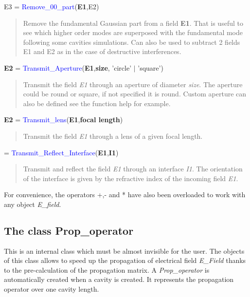 \noindent E3 = \textcolor{blue}{ Remove\_00\_part}(\textbf{E1},E2)
\vspace*{-0.2cm}
\begin{quote}
Remove the fundamental Gaussian part from a field \textbf{E1}. That is useful to see which higher order modes are superposed with the fundamental mode following some cavities simulations. Can also be used to subtract 2 fields E1 and E2 as in the case of destructive interferences.
\end{quote}


\noindent \textbf{E2} = \textcolor{blue}{Transmit\_Aperture}(\textbf{E1},\textbf{size}, 'circle' $\mid$ 'square')
\vspace*{-0.2cm}
\begin{quote}
Transmit the field \textsl{E1} through an aperture of diameter \textsl{size}. The aperture could be round or square, if not specified it is round. Custom aperture can also be defined see the function help for example.
\end{quote}

\noindent \textbf{E2} = \textcolor{blue}{Transmit\_lens}(\textbf{E1},\textbf{focal length})
\vspace*{-0.2cm}
\begin{quote}
Transmit the field \textsl{E1} through a lens of a given focal length.
\end{quote}

= \textcolor{blue}{Transmit\_Reflect\_Interface}(\textbf{E1},\textbf{I1})
\vspace*{-0.2cm}
\begin{quote}
Transmit and reflect the field \textsl{E1} through an interface \textsl{I1}. The orientation of the interface is given by the refractive index of the incoming field \textsl{E1}.
\end{quote}

For convenience, the operators +,- and * have also been overloaded to work with any object \textsl{E\_field}.

\subsection{The class Prop\_operator}
\label{Sec:DI}
This is an internal class which must be almost invisible for the user. The objects of this class allows to speed up the propagation of electrical field \textsl{E\_Field} thanks to the pre-calculation of the propagation matrix. A \textsl{Prop\_operator} is automatically created when a cavity is created. It represents the propagation operator over one cavity length.

